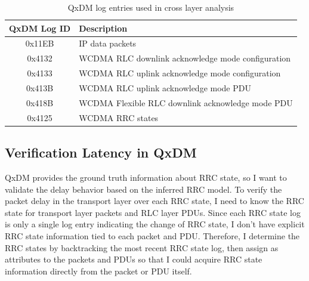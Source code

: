 
\begin{table}
\begin{tabularx}{0.48\textwidth}{ | c | X | }
	\hline
  	\textbf{QxDM Log ID} & \textbf{Description} \\
  	\hline\hline
  	0x11EB & IP data packets \\
  	\hline
  	0x4132 & WCDMA RLC downlink acknowledge mode configuration \\
  	\hline
  	0x4133 & WCDMA RLC uplink acknowledge mode configuration \\
  	\hline
  	0x413B & WCDMA RLC uplink acknowledge mode PDU \\
  	\hline
  	0x418B & WCDMA Flexible RLC downlink acknowledge mode PDU \\
  	\hline
  	0x4125 & WCDMA RRC states \\
  	\hline
\end{tabularx}
\caption{QxDM log entries used in cross layer analysis}
\label{tab:QxDM.logs}
\end{table}

\subsection{Verification Latency in QxDM}

QxDM provides the ground truth information about RRC state, so I want to validate the delay behavior based on the inferred RRC model. To verify the packet delay in the transport layer over each RRC state, I need to know the RRC state for transport layer packets and RLC layer PDUs. Since each RRC state log is only a single log entry indicating the change of RRC state, I don't have explicit RRC state information tied to each packet and PDU. Therefore, I determine the RRC states by backtracking the most recent RRC state log, then assign as attributes to the packets and PDUs so that I could acquire RRC state information directly from the packet or PDU itself. 

